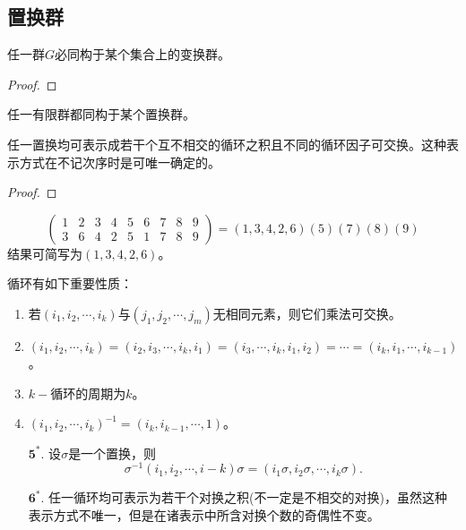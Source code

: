 \subsection{置换群}

\begin{theorem}[Calay定理]
	任一群$G$必同构于某个集合上的变换群。
\end{theorem}

\begin{proof}
	
\end{proof}

\begin{corollary}
	任一有限群都同构于某个置换群。
\end{corollary}

\begin{proposition}
	任一置换均可表示成若干个互不相交的循环之积且不同的循环因子可交换。这种表示方式在不记次序时是可唯一确定的。
\end{proposition}

\begin{proof}
	
\end{proof}

\begin{example}
	\begin{equation*}
		\begin{pmatrix}
			1&2  &3  &4  &5  &6  &7  &8  &9 \\
			3&6  &4  &2  &5  &1  &7  &8  &9
		  \end{pmatrix}
		  =(1,3,4,2,6)(5)(7)(8)(9)
	\end{equation*}
	结果可简写为$(1,3,4,2,6)$。
\end{example}

循环有如下重要性质：
\begin{enumerate}
	\item 若$(i_{1},i_{2},\cdots,i_{k})$与$(j_{1},j_{2},\cdots,j_{m})$无相同元素，则它们乘法可交换。
	\item $(i_{1},i_{2},\cdots,i_{k})=(i_{2},i_{3},\cdots,i_{k},i_{1})=(i_{3},\cdots,i_{k},i_{1},i_{2})=\cdots=(i_{k},i_{1},\cdots,i_{k-1})$。
	\item $k-$循环的周期为$k$。
	\item $(i_{1},i_{2},\cdots,i_{k})^{-1}=(i_{k},i_{k-1},\cdots,1)$。
	\item[$\textbf{5}^{*}$.] 设$\sigma$是一个置换，则
	\begin{equation*}
		\sigma^{-1}(i_{1},i_{2},\cdots,i-{k})\sigma=(i_{1}\sigma,i_{2}\sigma,\cdots,i_{k}\sigma).
	\end{equation*}
	\item[$\textbf{6}^{*}$.] 任一循环均可表示为若干个对换之积(不一定是不相交的对换)，虽然这种表示方式不唯一，但是在诸表示中所含对换个数的奇偶性不变。
\end{enumerate}

